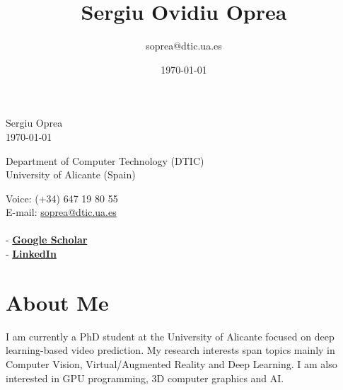 \documentclass[8pt]{article}
\title{\bfseries\Huge Sergiu Ovidiu Oprea}
\author{soprea@dtic.ua.es}
\date{\today}
\begin{document}
\begin{center}
	\Huge Sergiu Oprea\\
	\Large \today
\end{center}
\bigskip
\begin{minipage}[ht]{0.65\textwidth}
Department of Computer Technology (DTIC)\\
University of Alicante (Spain)\\
\end{minipage}
\hfill
\begin{minipage}[ht]{0.3\textwidth}
Voice: (+34) 647 19 80 55\\
E-mail: \href{mailto:soprea@dtic.ua.es}{soprea@dtic.ua.es}\\
\\
- \href{https://scholar.google.es/citations?user=JlZbbzIAAAAJ&hl=es}{\textbf{Google Scholar}}\\
- \href{https://www.linkedin.com/in/sergiu-oprea-12babaa9/}{\textbf{LinkedIn}}
\end{minipage}
 
\section*{About Me}

I am currently a PhD student at the University of Alicante focused on deep learning-based video prediction. My research interests span topics mainly in Computer Vision, Virtual/Augmented Reality and Deep Learning. I am also interested in GPU programming, 3D computer graphics and AI.
\end{document}
